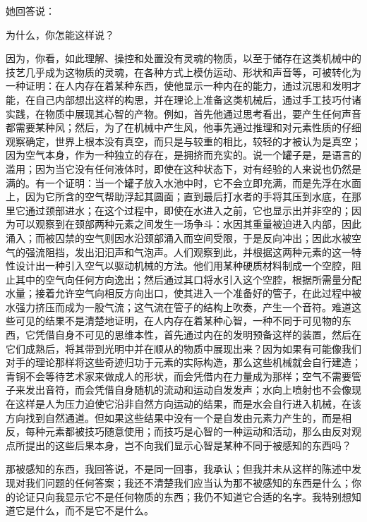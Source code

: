 她回答说：\par

为什么，你怎能这样说？\par

因为，你看，如此理解、操控和处置没有灵魂的物质，以至于储存在这类机械中的技艺几乎成为这物质的灵魂，在各种方式上模仿运动、形状和声音等，可被转化为一种证明：在人内存在着某种东西，使他显示一种内在的能力，通过沉思和发明才能，在自己内部想出这样的构思，并在理论上准备这类机械后，通过手工技巧付诸实践，在物质中展现其心智的产物。例如，首先他通过思考看出，要产生任何声音都需要某种风；然后，为了在机械中产生风，他事先通过推理和对元素性质的仔细观察确定，世界上根本没有真空，而只是与较重的相比，较轻的才被认为是真空；因为空气本身，作为一种独立的存在，是拥挤而充实的。说一个罐子是，是语言的滥用；因为当它没有任何液体时，即使在这种状态下，对有经验的人来说也仍然是满的。有一个证明：当一个罐子放入水池中时，它不会立即充满，而是先浮在水面上，因为它所含的空气帮助浮起其圆面；直到最后打水者的手将其压到水底，在那里它通过颈部进水；在这个过程中，即使在水进入之前，它也显示出并非空的；因为可以观察到在颈部两种元素之间发生一场争斗：水因其重量被迫进入内部，因此涌入；而被囚禁的空气则因水沿颈部涌入而空间受限，于是反向冲出；因此水被空气的强流阻挡，发出汩汩声和气泡声。人们观察到此，并根据这两种元素的这一特性设计出一种引入空气以驱动机械的方法。他们用某种硬质材料制成一个空腔，阻止其中的空气向任何方向逸出；然后通过其口将水引入这个空腔，根据所需量分配水量；接着允许空气向相反方向出口，使其进入一个准备好的管子，在此过程中被水强力挤压而成为一股气流；这气流在管子的结构上吹奏，产生一个音符。难道这些可见的结果不是清楚地证明，在人内存在着某种心智，一种不同于可见物的东西，它凭借自身不可见的思维本性，首先通过内在的发明预备这样的装置，然后在它们成熟后，将其带到光明中并在顺从的物质中展现出来？因为如果有可能像我们对手的理论那样将这些奇迹归功于元素的实际构造，那么这些机械就会自行建造；青铜不会等待艺术家来做成人的形状，而会凭借内在力量成为那样；空气不需要管子来发出音符，而会凭借自身随机的流动和运动自发发声；水向上喷射也不会像现在这样是人为压力迫使它沿非自然方向运动的结果，而是水会自行进入机械，在该方向找到自然通道。但如果这些结果中没有一个是自发由元素力产生的，而是相反，每种元素都被技巧随意使用；而技巧是心智的一种运动和活动，那么由反对观点所提出的这些后果本身，岂不向我们显示心智是某种不同于被感知的东西吗？\par

那被感知的东西，我回答说，不是同一回事，我承认；但我并未从这样的陈述中发现对我们问题的任何答案；我还不清楚我们应当认为那不被感知的东西是什么；你的论证只向我显示它不是任何物质的东西；我仍不知道它合适的名字。我特别想知道它是什么，而不是它不是什么。\par

